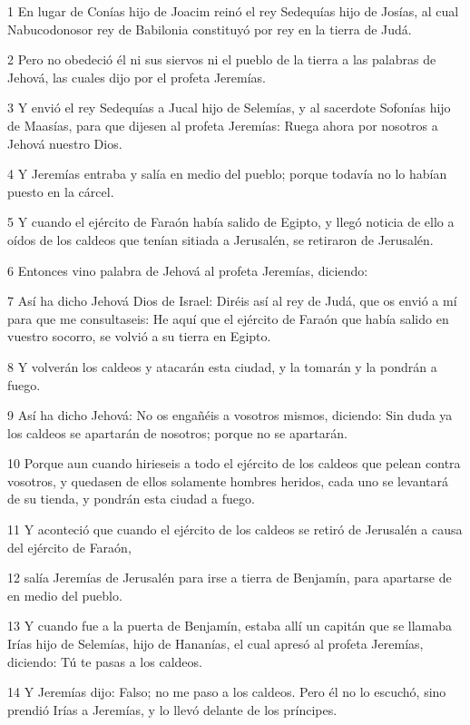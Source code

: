 \par 1 En lugar de Conías hijo de Joacim reinó el rey Sedequías hijo de Josías, al cual Nabucodonosor rey de Babilonia constituyó por rey en la tierra de Judá. 
\par 2 Pero no obedeció él ni sus siervos ni el pueblo de la tierra a las palabras de Jehová, las cuales dijo por el profeta Jeremías.
\par 3 Y envió el rey Sedequías a Jucal hijo de Selemías, y al sacerdote Sofonías hijo de Maasías, para que dijesen al profeta Jeremías: Ruega ahora por nosotros a Jehová nuestro Dios.
\par 4 Y Jeremías entraba y salía en medio del pueblo; porque todavía no lo habían puesto en la cárcel.
\par 5 Y cuando el ejército de Faraón había salido de Egipto, y llegó noticia de ello a oídos de los caldeos que tenían sitiada a Jerusalén, se retiraron de Jerusalén.
\par 6 Entonces vino palabra de Jehová al profeta Jeremías, diciendo:
\par 7 Así ha dicho Jehová Dios de Israel: Diréis así al rey de Judá, que os envió a mí para que me consultaseis: He aquí que el ejército de Faraón que había salido en vuestro socorro, se volvió a su tierra en Egipto. 
\par 8 Y volverán los caldeos y atacarán esta ciudad, y la tomarán y la pondrán a fuego.
\par 9 Así ha dicho Jehová: No os engañéis a vosotros mismos, diciendo: Sin duda ya los caldeos se apartarán de nosotros; porque no se apartarán.
\par 10 Porque aun cuando hirieseis a todo el ejército de los caldeos que pelean contra vosotros, y quedasen de ellos solamente hombres heridos, cada uno se levantará de su tienda, y pondrán esta ciudad a fuego.
\par 11 Y aconteció que cuando el ejército de los caldeos se retiró de Jerusalén a causa del ejército de Faraón,
\par 12 salía Jeremías de Jerusalén para irse a tierra de Benjamín, para apartarse de en medio del pueblo.
\par 13 Y cuando fue a la puerta de Benjamín, estaba allí un capitán que se llamaba Irías hijo de Selemías, hijo de Hananías, el cual apresó al profeta Jeremías, diciendo: Tú te pasas a los caldeos.
\par 14 Y Jeremías dijo: Falso; no me paso a los caldeos. Pero él no lo escuchó, sino prendió Irías a Jeremías, y lo llevó delante de los príncipes.
